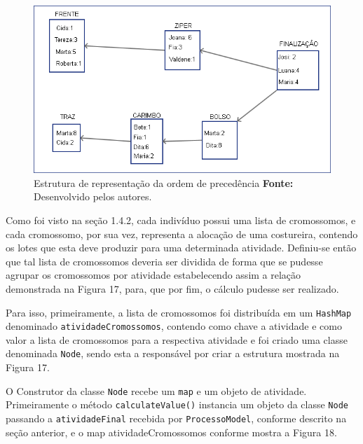 
\begin{figure}[h!]
	\centerline{\includegraphics[scale=0.6]{./imagens/montagem_node.png}}
	\caption[Estrutura de representação da ordem de precedência]
	{Estrutura de representação da ordem de precedência \textbf{Fonte:}
	Desenvolvido pelos autores.}
	\label{fig:exemplo1}
\end{figure}


\par Como foi visto na seção 1.4.2, cada indivíduo possui uma lista de
cromossomos, e cada cromossomo, por sua vez, representa a alocação de uma
costureira, contendo os lotes que esta deve produzir para uma determinada atividade. 
Definiu-se então que tal lista de cromossomos deveria ser dividida de forma que se pudesse 
agrupar os cromossomos por atividade estabelecendo assim
a relação demonstrada na Figura 17, para, que por fim, o cálculo pudesse ser
realizado.

\par Para isso, primeiramente, a lista de cromossomos foi distribuída em um \texttt{HashMap} denominado 
\texttt{atividadeCromossomos}, contendo como chave a atividade e como valor a lista de cromossomos para a 
respectiva atividade e foi criado uma classe denominada \texttt{Node}, sendo
esta a responsável por criar a estrutura mostrada na Figura 17.

\par O Construtor da classe \texttt{Node} recebe um \texttt{map} e um objeto de
atividade. Primeiramente o método \texttt{calculateValue()} instancia um objeto da classe \texttt{Node} passando 
a \texttt{atividadeFinal} recebida por \texttt{ProcessoModel}, conforme descrito
na seção anterior, e o map atividadeCromossomos conforme mostra a Figura 18.


